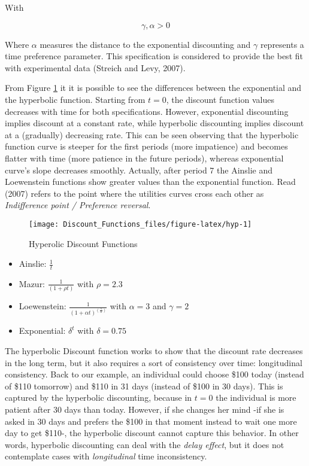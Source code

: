 \documentclass[]{article}
\providecommand{\tightlist}{%
  \setlength{\itemsep}{0pt}\setlength{\parskip}{0pt}}
\begin{document}
With

\[
\gamma, \alpha > 0
\]

Where \(\alpha\) measures the distance to the exponential discounting and \(\gamma\) represents a time preference parameter. This specification is considered to provide the best fit with experimental data (Streich and Levy, 2007).

From Figure \ref{fig:hyp} it it is possible to see the differences between the exponential and the hyperbolic function. Starting from \(t=0\), the discount function values decreases with time for both specifications. However, exponential discounting implies discount at a constant rate, while hyperbolic discounting implies discount at a (gradually) decreasing rate. This can be seen observing that the hyperbolic function curve is steeper for the first periods (more impatience) and becomes flatter with time (more patience in the future periods), whereas exponential curve's slope decreases smoothly. Actually, after period 7 the Ainslie and Loewenstein functions show greater values than the exponential function. Read (2007) refers to the point where the utilities curves cross each other as \emph{Indifference point / Preference reversal}.

\begin{figure}

{\centering \texttt{[image: Discount\_Functions\_files/figure-latex/hyp-1]} 

}

\caption{Hyperolic Discount Functions}\label{fig:hyp}
\end{figure}

\begin{itemize}
\tightlist
\item
  Ainslie: \(\frac{1}{t}\)
\item
  Mazur: \(\frac{1}{(1+ \rho t)}\) with \(\rho = 2.3\)
\item
  Loewenstein: \(\frac{1}{(1+ \alpha t)^(\frac{\gamma}{\alpha})}\) with \(\alpha = 3\) and \(\gamma = 2\)
\item
  Exponential: \(\delta^t\) with \(\delta = 0.75\)
\end{itemize}

The hyperbolic Discount function works to show that the discount rate decreases in the long term, but it also requires a sort of consistency over time: longitudinal consistency. Back to our example, an individual could choose \$100 today (instead of \$110 tomorrow) and \$110 in 31 days (instead of \$100 in 30 days). This is captured by the hyperbolic discounting, because in \(t=0\) the individual is more patient after 30 days than today. However, if she changes her mind -if she is asked in 30 days and prefers the \$100 in that moment instead to wait one more day to get \$110-, the hyperbolic discount cannot capture this behavior. In other words, hyperbolic discounting can deal with the \emph{delay effect}, but it does not contemplate cases with \emph{longitudinal} time inconsistency.
\end{document}
